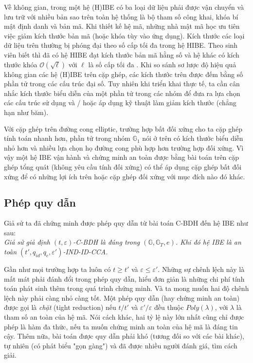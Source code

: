 \documentclass[class=report, crop=false]{standalone}
\begin{document}
			Về không gian, trong một hệ (H)IBE có ba loại dữ liệu phải được vận chuyển và lưu trữ với nhiều bản sao trên toàn hệ thống là bộ tham số công khai, khóa bí mật định danh và bản mã. Khi thiết kế hệ mã, những nhà mật mã học ưu tiên việc giảm kích thước bản mã (hoặc khóa tùy vào ứng dụng). Kích thước các loại dữ liệu trên thường bị phóng đại theo số cấp tối đa trong hệ HIBE. Theo sinh viên biết thì đã có hệ HIBE đạt kích thước bản mã hằng số và hệ khác có kích thước khóa $\mathcal{O}(\sqrt{\ell})$ với $\ell$ là số cấp tối đa \cite{DBLP:conf/eurocrypt/BonehBG05}. Khi so sánh sơ lược độ hiệu quả không gian các hệ (H)IBE trên cặp ghép, các kích thước trên được đếm bằng số phần tử trong các cấu trúc đại số. Tuy nhiên khi triển khai thực tế, ta cần cân nhắc kích thước biểu diễn của một phần tử trong các nhóm để đưa ra lựa chọn các cấu trúc sử dụng và / hoặc áp dụng kỹ thuật làm giảm kích thước (chẳng hạn như băm).

			Với cặp ghép trên đường cong elliptic, trường hợp bất đối xứng cho ta cặp ghép tính toán nhanh hơn, phần tử trong nhóm $\mathbb{G}_1$ nói ở trên có kích thước biểu diễn nhỏ hơn và nhiều lựa chọn họ đường cong phù hợp hơn trường hợp đối xứng. Vì vậy một hệ IBE vận hành và chứng minh an toàn được bằng bài toán trên cặp ghép tổng quát (không yêu cầu tính đối xứng) có thể áp dụng cặp ghép bất đối xứng để có những lợi ích trên hoặc cặp ghép đối xứng với mục đích nào đó khác.
		\subsection{Phép quy dẫn}
			Giả sử ta đã chứng minh được phép quy dẫn từ bài toán C-BDH đến hệ IBE \scheme như sau: \\ \indent
			\textit{
			Giả sử giả định $(t, \varepsilon)$-C-BDH là đúng trong $(\mathbb{G}, \mathbb{G}_T, e)$. Khi đó hệ IBE \scheme là an toàn $(t', q_{id}, q_c, \varepsilon')$-IND-ID-CCA.}
			
			Gần như mọi trường hợp ta luôn có $t \geq t'$ và $\varepsilon \leq \varepsilon'$. Những sự chênh lệch này là mất mát phải đánh đổi trong phép quy dẫn, hiểu đơn giản là những chi phí tính toán phát sinh thêm trong quá trình chứng minh. Và ta mong muốn hai độ chênh lệch này phải càng nhỏ càng tốt. Một phép quy dẫn (hay chứng minh an toàn) được gọi là \textit{chặt} (tight reduction) nếu $t / t'$ và $\varepsilon' / \varepsilon$ đều thuộc $Poly(\lambda)$, với $\lambda$ là tham số an toàn của hệ mã. Nói cách khác, hai tỷ lệ này lớn nhất cũng chỉ được phép là hàm đa thức, nếu ta muốn chứng minh an toàn của hệ mã là đáng tin cậy. Thêm nữa, bài toán được quy dẫn phải khó (tương đối so với các bài khác), tự nhiên (có phát biểu "gọn gàng") và đã được nhiều người đánh giá, tìm cách giải.
\end{document}
